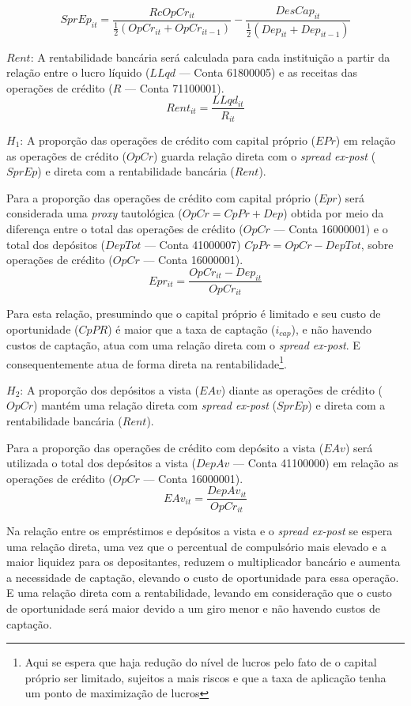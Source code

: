 \documentclass[12pt,12pt,openright,oneside,a4paper,chapter=TITLE,section=TITLE,subsection=TITLE,subsubsection=TITLE,english,french,spanish,portugues,sumario=tradicional]{abntex2}
\begin{document}
\[
SprEp_{it} = \frac{RcOpCr_{it}}{\frac{1}{2}(OpCr_{it} + OpCr_{it-1}) } - \frac{DesCap_{it}}{\frac{1}{2}(Dep_{it} + Dep_{it-1})}
\]

\(Rent\): A rentabilidade bancária será calculada para cada instituição a partir da relação entre o lucro líquido (\(LLqd\) --- Conta 61800005) e as receitas das operações de crédito (\(R\) --- Conta 71100001).
\[
Rent_{it} = \frac{LLqd_{it}}{R_{it}}
\]

\(H_{1}\): A proporção das operações de crédito com capital próprio (\(EPr\)) em relação as operações de crédito (\(OpCr\)) guarda relação direta com o \emph{spread ex-post} (\(SprEp\)) e direta com a rentabilidade bancária (\(Rent\)).

Para a proporção das operações de crédito com capital próprio (\(Epr\)) será considerada uma \emph{proxy} tautológica (\(OpCr = CpPr + Dep\)) obtida por meio da diferença entre o total das operações de crédito (\(OpCr\) --- Conta 16000001) e o total dos depósitos (\(DepTot\) --- Conta 41000007) \(CpPr = OpCr - DepTot\), sobre operações de crédito (\(OpCr\) --- Conta 16000001).
\[
Epr_{it} = \frac{OpCr_{it} - Dep_{it}}{OpCr_{it}}
\]

Para esta relação, presumindo que o capital próprio é limitado e seu custo de oportunidade (\(CpPR\)) é maior que a taxa de captação (\(i_{cap}\)), e não havendo custos de captação, atua com uma relação direta com o \emph{spread ex-post}. E consequentemente atua de forma direta na rentabilidade\footnote{Aqui se espera que haja redução do nível de lucros pelo fato de o capital próprio ser limitado, sujeitos a mais riscos e que a taxa de aplicação tenha um ponto de maximização de lucros}.

\(H_{2}\): A proporção dos depósitos a vista (\(EAv\)) diante as operações de crédito (\(OpCr\)) mantém uma relação direta com \emph{spread ex-post} (\(SprEp\)) e direta com a rentabilidade bancária (\(Rent\)).

Para a proporção das operações de crédito com depósito a vista (\(EAv\)) será utilizada o total dos depósitos a vista (\(DepAv\) --- Conta 41100000) em relação as operações de crédito (\(OpCr\) --- Conta 16000001).
\[
EAv_{it} = \frac{DepAv_{it}}{OpCr_{it}}
\]

Na relação entre os empréstimos e depósitos a vista e o \emph{spread ex-post} se espera uma relação direta, uma vez que o percentual de compulsório mais elevado e a maior liquidez para os depositantes, reduzem o multiplicador bancário e aumenta a necessidade de captação, elevando o custo de oportunidade para essa operação. E uma relação direta com a rentabilidade, levando em consideração que o custo de oportunidade será maior devido a um giro menor e não havendo custos de captação.
\end{document}
